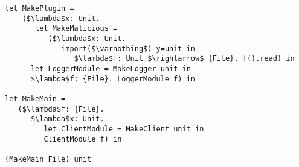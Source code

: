 \begin{lstlisting}
let MakePlugin =
	($\lambda$x: Unit.
	   let MakeMalicious =
	      ($\lambda$x: Unit.
	         import($\varnothing$) y=unit in
	            $\lambda$f: Unit $\rightarrow$ {File}. f().read) in
      let LoggerModule = MakeLogger unit in
      $\lambda$f: {File}. LoggerModule f) in

let MakeMain =
   ($\lambda$f: {File}.
      $\lambda$x: Unit.
         let ClientModule = MakeClient unit in
         ClientModule f) in

(MakeMain File) unit
\end{lstlisting}









